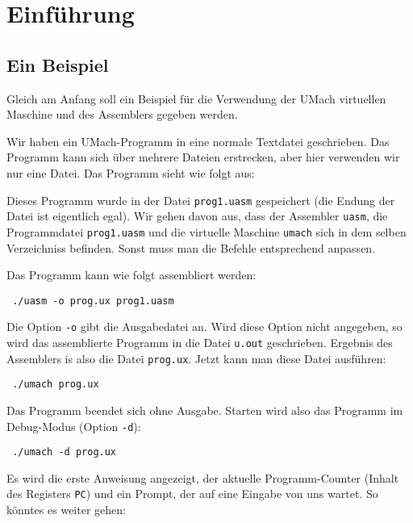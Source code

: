 \section{Einführung}

\subsection{Ein Beispiel}
Gleich am Anfang soll ein Beispiel für die Verwendung der UMach
virtuellen Maschine und des Assemblers gegeben werden.

Wir haben ein UMach-Programm in eine normale Textdatei geschrieben. Das Programm
kann sich über mehrere Dateien erstrecken, aber hier verwenden wir nur eine
Datei. Das Programm sieht wie folgt aus:



Dieses Programm wurde in der Datei \texttt{prog1.uasm} gespeichert (die Endung
der Datei ist eigentlich egal). Wir gehen davon aus, dass der Assembler
\texttt{uasm}, die Programmdatei \texttt{prog1.uasm} und die virtuelle Maschine
\texttt{umach} sich in dem selben Verzeichniss befinden. Sonst muss man die
Befehle entsprechend anpassen.

Das Programm kann wie folgt assembliert werden:
\begin{lstlisting}
 ./uasm -o prog.ux prog1.uasm
\end{lstlisting}

Die Option \texttt{-o} gibt die Ausgabedatei an. Wird diese Option nicht
angegeben, so wird das assemblierte Programm in die Datei \texttt{u.out}
geschrieben. Ergebnis des Assemblers is also die Datei \texttt{prog.ux}. Jetzt
kann man diese Datei \glqq ausführen\grqq:
\begin{lstlisting}
 ./umach prog.ux
\end{lstlisting}
Das Programm beendet sich ohne Ausgabe. Starten wird also das Programm im
Debug-Modus (Option \texttt{-d}):
\begin{lstlisting}
 ./umach -d prog.ux
\end{lstlisting}

Es wird die erste Anweisung angezeigt, der aktuelle Programm-Counter (Inhalt
des Registers \texttt{PC}) und ein Prompt, der auf eine Eingabe von uns wartet.
So könntes es weiter gehen:


